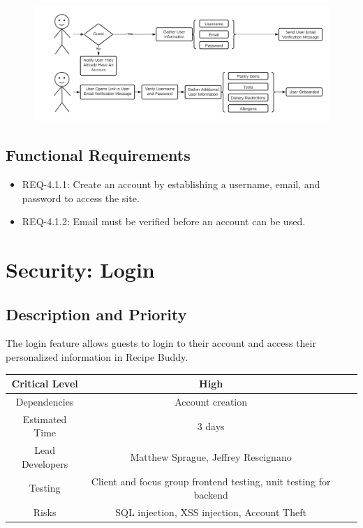 \documentclass{scrreprt}
\begin{document}
\begin{figure}[H]\centering
    \includegraphics[width=\columnwidth]{FlowCharts/Security-Account-Creation.png}
\end{figure}

\subsection{Functional Requirements}

\begin{itemize}
    \item REQ-4.1.1: Create an account by establishing a username, email, and password to access the site.
    \item REQ-4.1.2: Email must be verified before an account can be used.
\end{itemize}

\section{Security: Login}

\subsection{Description and Priority}

The login feature allows guests to login to their account and access their personalized information in \gls{Recipe Buddy}.

\begin{center}
    \begin{tabular}{| c | c | c | c |}
        \hline
        Critical Level  & High                                                              \\
        \hline
        Dependencies    & Account creation                                                  \\
        \hline
        Estimated Time  & 3 days                                                            \\
        \hline
        Lead Developers & Matthew Sprague, Jeffrey Rescignano                               \\
        \hline
        Testing         & Client and focus group frontend testing, unit testing for backend \\
        \hline
        Risks           & \gls{SQL injection}, \gls{XSS injection}, Account Theft           \\
        \hline
    \end{tabular}
\end{center}
\end{document}
